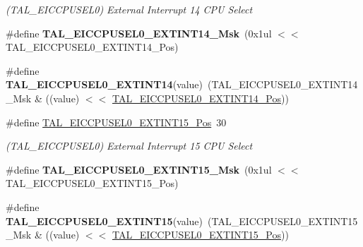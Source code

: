 \begin{DoxyCompactItemize}
\begin{DoxyCompactList}\small\item\em (T\+A\+L\+\_\+\+E\+I\+C\+C\+P\+U\+S\+E\+L0) External Interrupt 14 C\+P\+U Select \end{DoxyCompactList}\item 
\hypertarget{group___s_a_m_l21___t_a_l_ga9b921e0aba1d9450d48110bd1814ec90}{}\#define {\bfseries T\+A\+L\+\_\+\+E\+I\+C\+C\+P\+U\+S\+E\+L0\+\_\+\+E\+X\+T\+I\+N\+T14\+\_\+\+Msk}~(0x1ul $<$$<$ T\+A\+L\+\_\+\+E\+I\+C\+C\+P\+U\+S\+E\+L0\+\_\+\+E\+X\+T\+I\+N\+T14\+\_\+\+Pos)\label{group___s_a_m_l21___t_a_l_ga9b921e0aba1d9450d48110bd1814ec90}

\item 
\hypertarget{group___s_a_m_l21___t_a_l_gabcbd9d1349fc652f933fc00702c57e42}{}\#define {\bfseries T\+A\+L\+\_\+\+E\+I\+C\+C\+P\+U\+S\+E\+L0\+\_\+\+E\+X\+T\+I\+N\+T14}(value)~(T\+A\+L\+\_\+\+E\+I\+C\+C\+P\+U\+S\+E\+L0\+\_\+\+E\+X\+T\+I\+N\+T14\+\_\+\+Msk \& ((value) $<$$<$ \hyperlink{group___s_a_m_l21___t_a_l_gae4b56fc4930d13ba261e990990dda9e4}{T\+A\+L\+\_\+\+E\+I\+C\+C\+P\+U\+S\+E\+L0\+\_\+\+E\+X\+T\+I\+N\+T14\+\_\+\+Pos}))\label{group___s_a_m_l21___t_a_l_gabcbd9d1349fc652f933fc00702c57e42}

\item 
\hypertarget{group___s_a_m_l21___t_a_l_ga3d23d6e7efeac6d37402a6e03226534b}{}\#define \hyperlink{group___s_a_m_l21___t_a_l_ga3d23d6e7efeac6d37402a6e03226534b}{T\+A\+L\+\_\+\+E\+I\+C\+C\+P\+U\+S\+E\+L0\+\_\+\+E\+X\+T\+I\+N\+T15\+\_\+\+Pos}~30\label{group___s_a_m_l21___t_a_l_ga3d23d6e7efeac6d37402a6e03226534b}

\begin{DoxyCompactList}\small\item\em (T\+A\+L\+\_\+\+E\+I\+C\+C\+P\+U\+S\+E\+L0) External Interrupt 15 C\+P\+U Select \end{DoxyCompactList}\item 
\hypertarget{group___s_a_m_l21___t_a_l_ga7fbefd3ae06f30235a55be8c461c741c}{}\#define {\bfseries T\+A\+L\+\_\+\+E\+I\+C\+C\+P\+U\+S\+E\+L0\+\_\+\+E\+X\+T\+I\+N\+T15\+\_\+\+Msk}~(0x1ul $<$$<$ T\+A\+L\+\_\+\+E\+I\+C\+C\+P\+U\+S\+E\+L0\+\_\+\+E\+X\+T\+I\+N\+T15\+\_\+\+Pos)\label{group___s_a_m_l21___t_a_l_ga7fbefd3ae06f30235a55be8c461c741c}

\item 
\hypertarget{group___s_a_m_l21___t_a_l_gaaa60020e6c04696bad02a3997d446f6d}{}\#define {\bfseries T\+A\+L\+\_\+\+E\+I\+C\+C\+P\+U\+S\+E\+L0\+\_\+\+E\+X\+T\+I\+N\+T15}(value)~(T\+A\+L\+\_\+\+E\+I\+C\+C\+P\+U\+S\+E\+L0\+\_\+\+E\+X\+T\+I\+N\+T15\+\_\+\+Msk \& ((value) $<$$<$ \hyperlink{group___s_a_m_l21___t_a_l_ga3d23d6e7efeac6d37402a6e03226534b}{T\+A\+L\+\_\+\+E\+I\+C\+C\+P\+U\+S\+E\+L0\+\_\+\+E\+X\+T\+I\+N\+T15\+\_\+\+Pos}))\label{group___s_a_m_l21___t_a_l_gaaa60020e6c04696bad02a3997d446f6d}


\end{DoxyCompactItemize}
